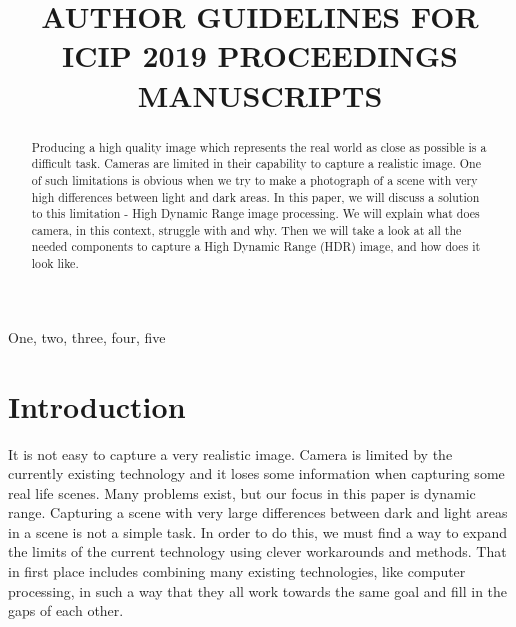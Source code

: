 \documentclass{article}
\title{AUTHOR GUIDELINES FOR ICIP 2019 PROCEEDINGS MANUSCRIPTS}
\begin{document}
%
\maketitle
%
\begin{abstract}
  Producing a high quality image which represents the real world as close as possible is a difficult task. 
  Cameras are limited in their capability to capture a realistic image. 
  One of such limitations is obvious when we try to make a photograph of a scene with very high differences between light and dark areas. 
  In this paper, we will discuss a solution to this limitation - High Dynamic Range image processing. 
  We will explain what does camera, in this context, struggle with and why. 
  Then we will take a look at all the needed components to capture a High Dynamic Range (HDR) image, and how does it look like.
\end{abstract}
%
\begin{keywords}
One, two, three, four, five
\end{keywords}
%
\section{Introduction}
\label{sec:intro}
It is not easy to capture a very realistic image. Camera is limited by the currently existing technology and it loses some information when capturing some real life scenes. 
Many problems exist, but our focus in this paper is dynamic range. Capturing a scene with very large differences between dark and light areas in a scene is not a simple task. 
In order to do this, we must find a way to expand the limits of the current technology using clever workarounds and methods.
That in first place includes combining many existing technologies, like computer processing, in such a way that they all work towards the same goal and fill in the gaps of each other. %

\end{document}
